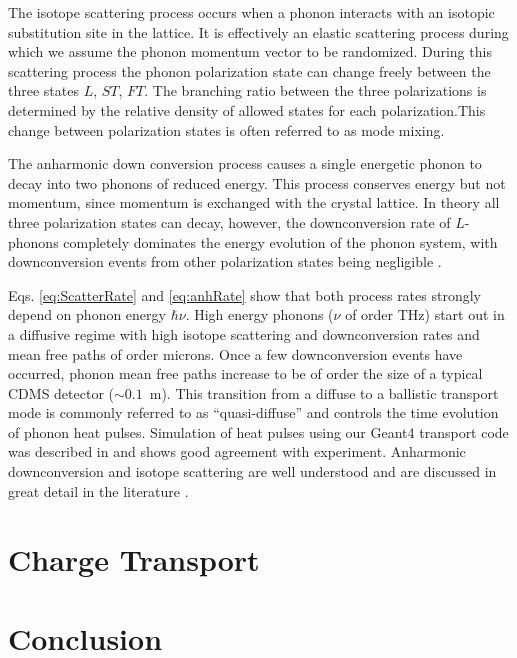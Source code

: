 \documentclass[preprint,12pt]{elsarticle}
\begin{document}
The isotope scattering process occurs when a phonon interacts with an isotopic substitution site in the lattice. It is effectively an elastic scattering process during which we assume the phonon momentum vector to be randomized. During this scattering process the phonon polarization state can change freely between the three states $L$, $ST$, $FT$. The branching ratio between the three polarizations is determined by the relative density of allowed states for each polarization.This change between polarization states is often referred to as mode mixing.

The anharmonic down conversion process causes a single energetic phonon to decay into two phonons of reduced energy. This process conserves energy but not momentum, since momentum is exchanged with the crystal lattice. In theory all three polarization states can decay, however, the downconversion rate of $L$-phonons completely dominates the energy evolution of the phonon system, with downconversion events from other polarization states being negligible \cite{Tamura2}.


Eqs. \ref{eq:ScatterRate} and \ref{eq:anhRate} show that both process rates strongly depend on phonon energy $\hbar \nu$. High energy phonons ($\nu$ of order THz) start out in a diffusive regime with high isotope scattering and downconversion rates and mean free paths of order microns. Once a few downconversion events have occurred, phonon mean free paths increase to be of order the size of a typical CDMS detector ($\sim0.1$~m). This transition from a diffuse to a ballistic transport mode is commonly referred to as ``quasi-diffuse'' and controls the time evolution of phonon heat pulses. Simulation of heat pulses using our Geant4 transport code was described in \cite{Brandt} and shows good agreement with experiment. Anharmonic downconversion and isotope scattering are well understood and are discussed in great detail in the literature \cite{Tamura1}\cite{Tamura2}\cite{Wolfe}\cite{Tamura3}.




\section{Charge Transport}
\label{sec:ChargeTransport}



\section{Conclusion}
\label{sec:Conclusion}
\end{document}
